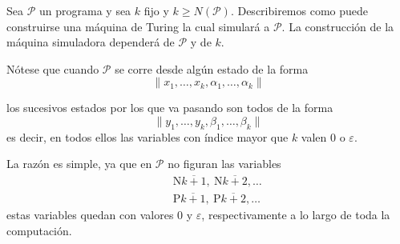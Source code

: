 \begin{frame}
	\PN Sea $\mathcal{P}$ un programa y sea $k$ fijo y $k \geq N(\mathcal{P})$. Describiremos como puede construirse una
	máquina de Turing la cual simulará a $\mathcal{P}$. La construcción de la máquina simuladora dependerá de
	$\mathcal{P}$ y de $k$.

	\PN Nótese que cuando $\mathcal{P}$ se corre desde algún estado de la forma
	\begin{equation*}
		\lVert x_{1}, \dotsc, x_{k}, \alpha_{1}, \dotsc, \alpha_{k} \rVert
	\end{equation*}

	\PN los sucesivos estados por los que va pasando son todos de la forma
	\begin{equation*}
		\lVert y_{1}, \dotsc, y_{k}, \beta_{1}, \dotsc, \beta_{k} \rVert
	\end{equation*}
	\PN es decir, en todos ellos las variables con índice mayor que $k$ valen $0$ o $\varepsilon$.

	\PN La razón es simple, ya que en $\mathcal{P}$ no figuran las variables
	\begin{eqnarray*}
		&&\mathrm{N}\overline{k+1}, \ \mathrm{N}\overline{k+2}, \dotsc \\
		&&\mathrm{P}\overline{k+1}, \ \mathrm{P}\overline{k+2}, \dotsc
	\end{eqnarray*}
	\PN estas variables quedan con valores $0$ y $\varepsilon$, respectivamente a lo largo de toda la computación.
\end{frame}
